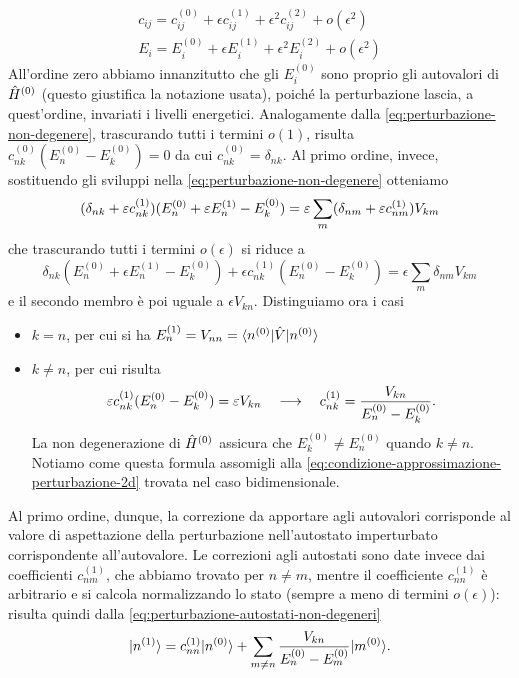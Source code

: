 \begin{equation}
	\begin{gathered}
		c_{ij}=c^{(0)}_{ij}+\epsilon c^{(1)}_{ij}+\epsilon^2 c^{(2)}_{ij}+o(\epsilon^2)\\
		E_{i}=E^{(0)}_i+\epsilon E^{(1)}_i+\epsilon^2 E^{(2)}_i+o(\epsilon^2)
	\end{gathered}
\end{equation}
All'ordine zero abbiamo innanzitutto che gli $E^{(0)}_i$ sono proprio gli autovalori di $\op H^{(0)}$ (questo giustifica la notazione usata), poich\'e la perturbazione lascia, a quest'ordine, invariati i livelli energetici.
Analogamente dalla \eqref{eq:perturbazione-non-degenere}, trascurando tutti i termini $o(1)$, risulta $c^{(0)}_{nk}(E^{(0)}_n-E^{(0)}_k)=0$ da cui $c^{(0)}_{nk}=\delta_{nk}$.
Al primo ordine, invece, sostituendo gli sviluppi nella \eqref{eq:perturbazione-non-degenere} otteniamo
\begin{equation}
	(\delta_{nk}+\epsilon c^{(1)}_{nk})(E^{(0)}_n+\epsilon E^{(1)}_n-E^{(0)}_k)=\epsilon\sum_m(\delta_{nm}+\epsilon c^{(1)}_{nm})V_{km}\\
\end{equation}
che trascurando tutti i termini $o(\epsilon)$ si riduce a
\begin{equation}
	\delta_{nk}(E^{(0)}_n+\epsilon E^{(1)}_n-E^{(0)}_k)+\epsilon c^{(1)}_{nk}(E^{(0)}_n-E^{(0)}_k)=\epsilon\sum_m\delta_{nm}V_{km}
\end{equation}
e il secondo membro è poi uguale a $\epsilon V_{kn}$.
Distinguiamo ora i casi
\begin{itemize}
	\item $k=n$, per cui si ha $E^{(1)}_n=V_{nn}=\bra{n^{(0)}}\op V\ket{n^{(0)}}$
	\item $k\ne n$, per cui risulta
		\begin{equation}
			\epsilon c^{(1)}_{nk}(E^{(0)}_n-E^{(0)}_k)=\epsilon V_{kn}\qqq c^{(1)}_{nk}=\frac{V_{kn}}{E^{(0)}_n-E^{(0)}_k}.
			\label{eq:perturbazione-non-degenere-primo-ordine}
		\end{equation}
		La non degenerazione di $\op H^{(0)}$ assicura che $E^{(0)}_k\ne E^{(0)}_n$ quando $k\ne n$.
		Notiamo come questa formula assomigli alla \eqref{eq:condizione-approssimazione-perturbazione-2d} trovata nel caso bidimensionale.
\end{itemize}
Al primo ordine, dunque, la correzione da apportare agli autovalori corrisponde al valore di aspettazione della perturbazione nell'autostato imperturbato corrispondente all'autovalore.
Le correzioni agli autostati sono date invece dai coefficienti $c^{(1)}_{nm}$, che abbiamo trovato per $n\ne m$, mentre il coefficiente $c^{(1)}_{nn}$ è arbitrario e si calcola normalizzando lo stato (sempre a meno di termini $o(\epsilon)$): risulta quindi dalla \eqref{eq:perturbazione-autostati-non-degeneri}
\begin{equation}
	\ket{n^{(1)}}=c^{(1)}_{nn}\ket{n^{(0)}}+\sum_{m\ne n}\frac{V_{kn}}{E^{(0)}_n-E^{(0)}_m}\ket{m^{(0)}}.
	\label{eq:perturbazione-autostati-non-degeneri-primo-ordine}
\end{equation}

